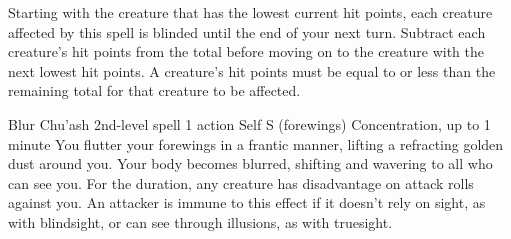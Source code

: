 Starting with the creature that has the lowest current hit points, each creature affected by this spell is blinded until the end of your next turn.
Subtract each creature's hit points from the total before moving on to the creature with the next lowest hit points.
A creature's hit points must be equal to or less than the remaining total for that creature to be affected.

\DndSpellHeader %
  {Blur \label{spell::blur}}
  {Chu'ash 2nd-level spell}
  {1 action}
  {Self}
  {S (forewings)}
  {Concentration, up to 1 minute}
You flutter your forewings in a frantic manner, lifting a refracting golden dust around you.
Your body becomes blurred, shifting and wavering to all who can see you.
For the duration, any creature has disadvantage on attack rolls against you.
An attacker is immune to this effect if it doesn't rely on sight, as with blindsight, or can see through illusions, as with truesight.

